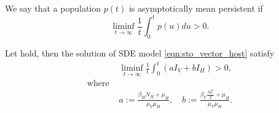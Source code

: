 \begin{definition}
    We say that a population $p(t)$ is asymptotically mean persistent
    if
    $$
        \liminf_{t \to \infty}
            \frac{1}{t}
                \int_{0} ^ t
                    p(u) du
        > 0.
    $$
\end{definition}
\begin{theorem}
    Let  hold, then the solution of SDE model
    \eqref{eqn:sto_vector_host} satisfy
    \begin{align*}
        &\liminf_{t \to \infty}
            \frac{1}{t}
            \int_{0} ^ {t}
            (a I_V + b I_H) > 0, 
            \\
                \text{where }
            &
            \\
            & a:= \frac{\beta_H N_H + \mu_H}{\mu_V \mu_H},
            \quad
            b:=
            \frac{
                \beta_V \frac{N_V ^ {\infty}}{2}
                + \mu_H
                }{\mu_V \mu_H}.
    \end{align*}
\end{theorem}
%
